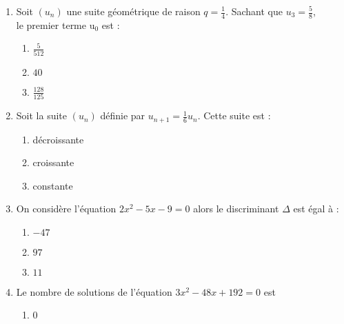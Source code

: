 \documentclass[oneside,twocolumn,landscape]{book}
\begin{document}
\begin{enumerate}
\item Soit $\left(u_{n}\right)$ une suite géométrique de raison $q=\frac{1}{4}$. Sachant que $u_{3}=\frac{5}{8}$,\\ le premier terme $\mathrm{u}_ {0}$ est :

\begin{enumerate}


\item\MauvaiseReponse $\frac{5}{512}$

\item\BonneReponse $40$

\item\MauvaiseReponse $\frac{128}{125}$

\end{enumerate}



\item Soit la suite $\left(u_{n}\right)$ définie par $u_{n+1}=\frac{1}{6}u_n$. Cette suite est :

\begin{enumerate}

\item\BonneReponse décroissante

\item\MauvaiseReponse croissante


\item\MauvaiseReponse constante

\end{enumerate}

\newpage


\item On considère l'équation $2x^{2}-5 x-9=0$ alors le discriminant $\Delta$ est égal à :

\begin{enumerate}


\item\MauvaiseReponse $-47$

\item\BonneReponse $97$

\item\MauvaiseReponse $11$

\end{enumerate}


\item Le nombre de solutions de l'équation $3x^{2}-48 x+192=0$ est

\begin{enumerate}

\item\MauvaiseReponse $0$



\end{enumerate}
\end{enumerate}
\end{document}
